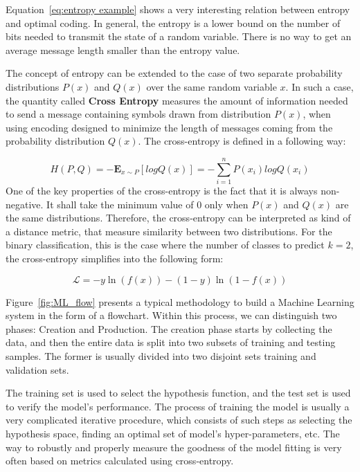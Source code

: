 Equation~\ref{eq:entropy example} shows a very interesting relation between entropy and optimal coding. In general, the entropy is a lower bound on the number of bits needed to transmit the state of a random variable. There is no way to get an average message length smaller than the entropy value.   

The concept of entropy can be extended to the case of two separate probability distributions $P(x)$ and $Q(x)$ over the same random variable $x$.  In such a case, the quantity called \textbf{Cross Entropy}  measures the amount of information needed to send a message containing symbols drawn from distribution $P(x)$, when using encoding designed to minimize the length of messages coming from the probability distribution $Q(x)$.  
The cross-entropy is defined in a following way:

\begin{equation}
H(P,Q) = - \mathbf{E}_{x\sim P}[log Q(x)] = - \sum_{i=1}^{n} P(x_i)log Q(x_i)
\end{equation}
One of the key properties of the cross-entropy is the fact that it is always non-negative. It shall take the minimum value of $0$ only when $P(x)$ and $Q(x)$ are the same distributions. Therefore, the cross-entropy can be interpreted as kind of a distance metric, that measure similarity between two distributions. For the binary classification, this is the case where the number of classes to predict $k=2$, the cross-entropy simplifies into the following form:

\begin{equation}
\label{eq:CE_binary}
   \mathcal{L} = -y \ln\left( f(x) \right) - (1-y) \ln\left(1 -f(x) \right)
\end{equation}


Figure~\ref{fig:ML_flow} presents a typical methodology to build a Machine Learning system in the form of a flowchart. 
Within this process, we can distinguish two phases: Creation and Production. The creation phase starts by collecting the data, and then the entire data is split into two subsets of training and testing samples. The former is usually divided into two disjoint sets training and validation sets.

The training set is used to select the hypothesis function, and the test set is used to verify the model's performance.
The process of training the model is usually a very complicated iterative procedure, which consists of such steps as selecting the hypothesis space, finding an optimal set of model's hyper-parameters, etc. The way to robustly and properly measure the goodness of the model fitting is very often based on metrics calculated using cross-entropy.

